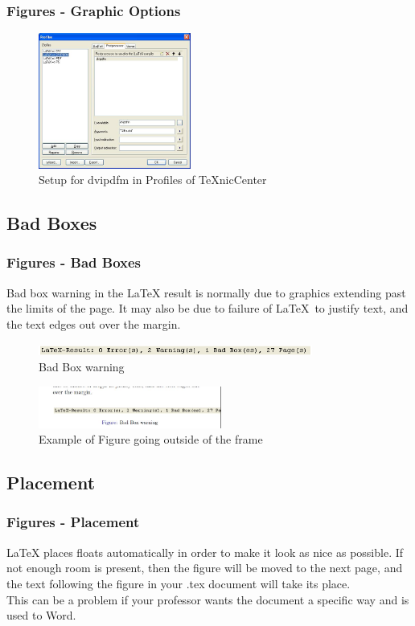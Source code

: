 \documentclass{beamer}
\begin{document}
\begin{frame}
\frametitle{Figures - Graphic Options}
\begin{figure}[htbp]
\centering
\includegraphics[width=5cm]{dvipdfm.jpg}
\caption{Setup for dvipdfm in Profiles of TeXnicCenter}
\label{fig::dvipdfm}
\end{figure}
\end{frame}

\subsection{Bad Boxes}

\begin{frame}
\frametitle{Figures - Bad Boxes}
Bad box warning in the \LaTeX{} result is normally due to graphics extending past the limits of the page.  It may also be due to failure of \LaTeX \ to justify text, and the text edges out over the margin.

\begin{figure}[htbp]
\centering
\includegraphics[width=9cm]{badboxwarning.png}
\caption{Bad Box warning}
\label{fig::badboxwarning}
\end{figure}

\begin{figure}[htbp]
\centering
\includegraphics[width=6cm]{overflow.jpg}
\caption{Example of Figure going outside of the frame}
\label{fig::overflow}
\end{figure}
\end{frame}

\subsection{Placement}

\begin{frame}
\frametitle{Figures - Placement}
\LaTeX{} places floats automatically in order to make it look as nice as possible.  If not enough room is present, then the figure will be moved to the next page, and the text following the figure in your .tex document will take its place.\\
\vspace{1cm}
This can be a problem if your professor wants the document a specific way and is used to Word.
  
\end{frame}
\end{document}
